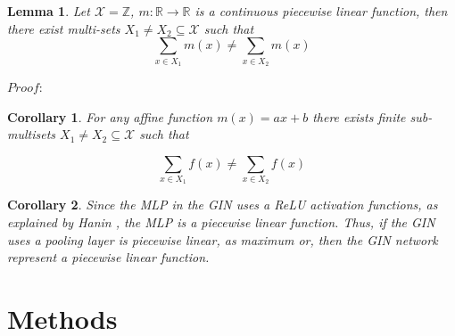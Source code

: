 \documentclass{article}
\newtheorem{lemma}[theorem]{Lemma}
\newtheorem{corollary}{Corollary}[theorem]
\begin{document}
\begin{lemma}
    Let $\mathcal{X}=\mathbb{Z}$, $m:\mathbb{R}\to\mathbb{R}$ is a continuous piecewise linear function,
    then there exist multi-sets $X_1 \neq X_2 \subseteq \mathcal{X}$ such that \\
    \[ \sum_{x\in X_1}m(x) \neq \sum_{x\in X_2}m(x) \]

\end{lemma}
$Proof:$ \\



\begin{corollary}
For any affine function $m(x) = ax + b $ there exists finite sub-multisets $X_1 \neq X_2 \subseteq \mathcal{X}$ such that

\[ \sum_{x\in X_1}f(x) \neq \sum_{x\in X_2}f(x) \]
\end{corollary}
\begin{corollary}
Since the MLP in the GIN uses a ReLU activation functions, as explained by Hanin \cite{Hanin}, the MLP is a piecewise linear function. 
Thus, if the GIN uses a pooling layer is piecewise linear, as maximum or, then the GIN network represent a piecewise linear function.
\end{corollary}



\part*{Methods}
\end{document}
